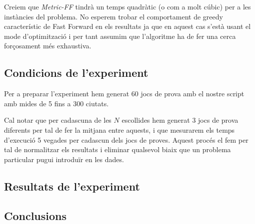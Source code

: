 \documentclass[11pt,a4paper]{article}
\begin{document}
Creiem que \emph{Metric-FF} tindrà un temps quadràtic (o com a molt cúbic) per a les instàncies del problema. No esperem trobar el comportament de greedy característic de Fast Forward en els resultats ja que en aquest cas s'està usant el mode d'optimització i per tant assumim que l'algoritme ha de fer una cerca forçosament més exhaustiva.

\subsection{Condicions de l'experiment}

Per a preparar l'experiment hem generat 60 jocs de prova amb el nostre script amb mides de 5 fins a 300 ciutats. 

Cal notar que per cadascuna de les $N$ escollides hem generat 3 jocs de prova diferents per tal de fer la mitjana entre aquests, i que mesurarem els temps d'execució 5 vegades per cadascun dels jocs de proves. Aquest procés el fem per tal de normalitzar els resultats i eliminar qualsevol biaix que un problema particular pugui introduïr en les dades.

\subsection{Resultats de l'experiment}



\subsection{Conclusions}
\end{document}
